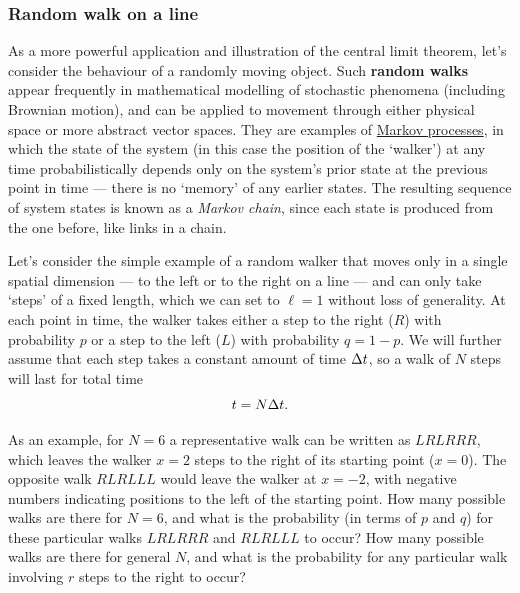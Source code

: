 \subsubsection{Random walk on a line}
As a more powerful application and illustration of the central limit theorem, let's consider the behaviour of a randomly moving object.
Such \textbf{random walks} appear frequently in mathematical modelling of stochastic phenomena (including Brownian motion), and can be applied to movement through either physical space or more abstract vector spaces.
They are examples of \href{https://en.wikipedia.org/wiki/Markov_process}{Markov processes}, in which the state of the system (in this case the position of the `walker') at any time probabilistically depends only on the system's prior state at the previous point in time --- there is no `memory' of any earlier states. %
The resulting sequence of system states is known as a \textit{Markov chain}, since each state is produced from the one before, like links in a chain.

Let's consider the simple example of a random walker that moves only in a single spatial dimension --- to the left or to the right on a line --- and can only take `steps' of a fixed length, which we can set to $\ell = 1$ without loss of generality.
At each point in time, the walker takes either a step to the right ($R$) with probability $p$ or a step to the left ($L$) with probability $q = 1 - p$.
We will further assume that each step takes a constant amount of time $\Delta t$, so a walk of $N$ steps will last for total time
\begin{equation}
  \label{eq:RWtime}
  t = N \Delta t.
\end{equation}

As an example, for $N = 6$ a representative walk can be written as $LRLRRR$, which leaves the walker $x = 2$ steps to the right of its starting point ($x = 0$).
The opposite walk $RLRLLL$ would leave the walker at $x = -2$, with negative numbers indicating positions to the left of the starting point.
How many possible walks are there for $N = 6$, and what is the probability (in terms of $p$ and $q$) for these particular walks $LRLRRR$ and $RLRLLL$ to occur?
How many possible walks are there for general $N$, and what is the probability for any particular walk involving $r$ steps to the right to occur?
\begin{mdframed}
  \ \\[100 pt]
\end{mdframed}


